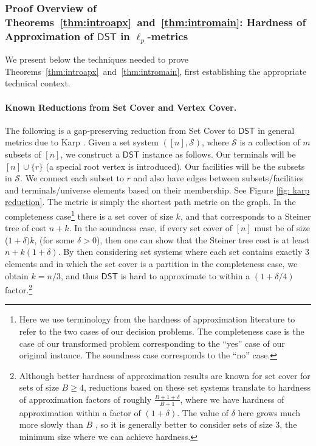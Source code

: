\documentclass{theoretics}
\newcommand{\1}{\textbf{1}}
\newcommand{\dst}{$\mathsf{DST}$\xspace}
\begin{document}
\subsubsection{\texorpdfstring{Proof Overview of Theorems~\ref{thm:introapx}~and~\ref{thm:intromain}: Hardness of Approximation of \dst in $\ell_p$-metrics}{Proof Overview of Theorems~\ref{thm:introapx}~and~\ref{thm:intromain}: Hardness of Approximation of DST in lp-metrics}}

We present below the techniques needed to prove Theorems~\ref{thm:introapx}~and~\ref{thm:intromain}, first establishing the appropriate technical context.
%
\paragraph{Known Reductions from Set Cover and Vertex Cover.} 
The following is a gap-preserving reduction from Set Cover to \dst in general metrics due to Karp \cite{karp1972reducibility}. 
Given a set system $([n],\mathcal{S})$, where $\mathcal{S}$ is a collection of $m$ subsets of $[n]$, we construct a \dst instance as follows. Our terminals will be $[n]\cup\{r\}$ (a special root vertex is introduced). Our facilities will be the subsets in $\mathcal{S}$. We connect each subset to $r$ and also have edges between subsets/facilities and terminals/universe elements based on their membership. See Figure \ref{fig: karp reduction}. The metric is simply the shortest path metric on the graph. In the completeness case\footnote{Here we use  terminology from the hardness of approximation literature to refer to the two cases of our decision problems. The completeness case is the case of our transformed problem corresponding to the ``yes'' case of our original instance. The soundness case corresponds to the ``no'' case.} there is a set cover of size $k$, and that corresponds to a Steiner tree of cost $n+k$. In the soundness case, if every set cover of $[n]$ must be of size ($1+\delta)k$, (for some $\delta>0$), then one can show that the Steiner tree cost is at least $n + k(1+\delta)$. By then considering set systems where each set contains exactly 3 elements and in which the set cover is a partition in the completeness case, we obtain $k=n/3$, and thus \dst is hard to approximate to within a  $(1+\delta/4)$ factor.\footnote{Although better hardness of approximation results are known for set cover for sets of size $B \geq 4$, reductions based on these set systems translate to hardness of approximation factors of roughly $\frac{B+ 1 + \delta}{B + 1}$, where we have hardness of approximation within a factor of $(1 + \delta)$. The value of $\delta$ here grows much more slowly than $B$ \cite{trevisan2001non}, so it is generally better to consider sets of size $3$, the minimum size where we can achieve hardness.}
\end{document}
